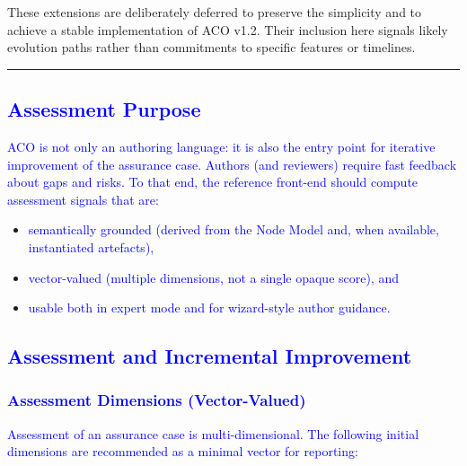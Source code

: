 \documentclass[11pt]{article}
\begin{document}
These extensions are deliberately deferred to preserve the simplicity and to achieve a stable implementation
of ACO v1.2. Their inclusion here signals likely evolution paths
rather than commitments to specific features or timelines.

\bigskip
\hrule
\bigskip


\subsection{\textcolor{blue}{Assessment Purpose}}

\textcolor{blue}{ACO is not only an authoring language: it is also the entry point for iterative improvement of the assurance case. Authors (and reviewers) require fast feedback about gaps and risks. To that end, the reference front-end should compute assessment signals that are:}
\begin{itemize}[leftmargin=2em]
  \item \textcolor{blue}{semantically grounded (derived from the Node Model and, when available, instantiated artefacts),}
  \item \textcolor{blue}{vector-valued (multiple dimensions, not a single opaque score), and}
  \item \textcolor{blue}{usable both in expert mode and for wizard-style author guidance.}
\end{itemize}

\subsection{\textcolor{blue}{Assessment and Incremental Improvement}}\label{sec:assessment}

\subsubsection{\textcolor{blue}{Assessment Dimensions (Vector-Valued)}}

\textcolor{blue}{Assessment of an assurance case is multi-dimensional. The following initial dimensions are recommended as a minimal vector for reporting:}
\end{document}
